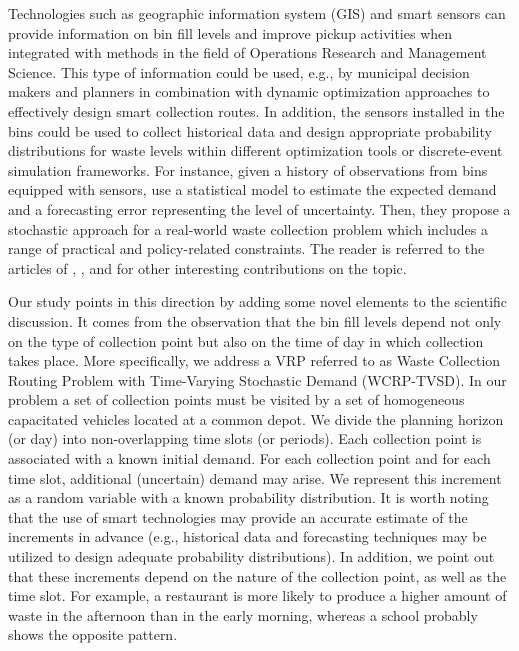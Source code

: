 \documentclass[preprint,11pt,authoryear]{elsarticle}
\begin{document}
Technologies such as geographic information system (GIS) and smart sensors can provide information on bin fill levels and improve pickup activities when integrated with methods in the field of Operations Research and Management Science. This type of information could be used, e.g., by municipal decision makers and planners in combination with dynamic optimization approaches to effectively design smart collection routes. In addition, the sensors installed in the bins could be used to collect historical data and design appropriate probability distributions for waste levels within different optimization tools or discrete-event simulation frameworks. For instance, given a history of observations from bins equipped with sensors, \cite{Markov2020} use a statistical model to estimate the expected demand and a forecasting error representing the level of uncertainty. Then, they propose a stochastic approach for a real-world waste collection problem which includes a range of practical and policy-related constraints. The reader is referred to the articles of \cite{Johansson2006}, \cite{Rovetta2009}, and \cite{Morais2024} for other interesting contributions on the topic. 

Our study points in this direction by adding some novel elements to the scientific discussion. It comes from the observation that the bin fill levels depend not only on the type of collection point but also on the time of day in which collection takes place.        
More specifically, we address a VRP referred to as Waste Collection Routing Problem with Time-Varying Stochastic Demand (WCRP-TVSD). In our problem a set of collection points must be visited by a set of homogeneous capacitated vehicles located at a common depot. We divide the planning horizon (or day) into non-overlapping time slots (or periods). 
Each collection point is associated with a known initial demand. For each collection point and for each time slot, additional (uncertain) demand may
arise. We represent this increment as a random variable with a known probability distribution.
%
It is worth noting that the use of smart technologies may provide an accurate estimate of the increments in advance (e.g., historical data and forecasting techniques may be utilized to design adequate probability distributions). In addition, we point out that these increments depend on the nature of the collection point, as well as the time slot. For example, a restaurant is more likely to produce a higher amount of waste in the afternoon than in the early morning, whereas a school probably shows the opposite pattern.
 
\end{document}
